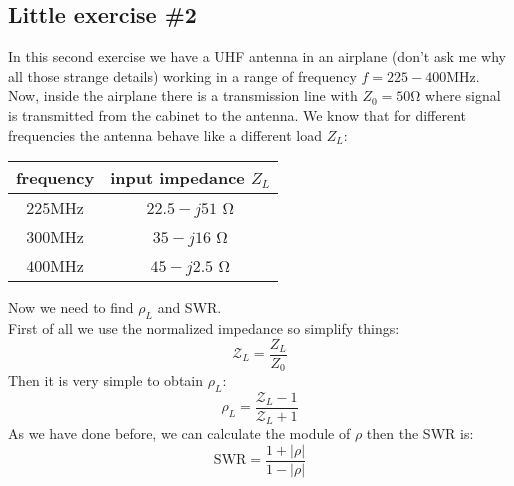 \subsection*{Little exercise \#2}
In this second exercise we have a UHF antenna in an airplane (don't ask me why all those strange details) working in a range of frequency $f=225-400\si{\mega\hertz}$.\\
Now, inside the airplane there is a transmission line with $Z_0=50\si{\ohm}$ where signal is transmitted from the cabinet to the antenna. We know that for different frequencies the antenna behave like a different load $Z_L$:
\begin{center}
    \begin{tabular}{|c|c|}
        \hline
        frequency&input impedance $Z_L$\\
        \hline
        $225$\si{\mega\hertz}&$22.5-j51$ \si{\ohm}\\
        \hline
        $300$\si{\mega\hertz}&$35-j16$ \si{\ohm}\\
        \hline
        $400$\si{\mega\hertz}&$45-j2.5$ \si{\ohm} \\
        \hline
    \end{tabular}
\end{center}
Now we need to find $\rho_L$ and SWR.\\
First of all we use the normalized impedance so simplify things:
\begin{equation*}
    \mathcal{Z}_L=\frac{Z_L}{Z_0}
\end{equation*}
Then it is very simple to obtain $\rho_L$:
\begin{equation*}
    \rho_L=\frac{\mathcal{Z}_L-1}{\mathcal{Z}_L+1}
\end{equation*}
As we have done before, we can calculate the module of $\rho$ then the SWR is:
\begin{equation*}
    \text{SWR}=\frac{1+|\rho|}{1-|\rho|}
\end{equation*}
